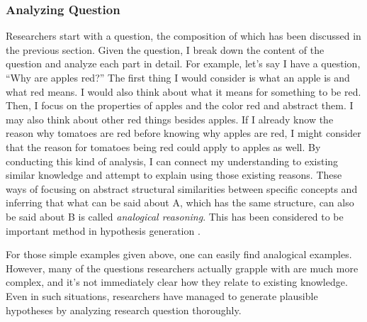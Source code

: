 
\subsubsection{Analyzing Question}
Researchers start with a question, the composition of which has been discussed in the previous section. Given the question, I break down the content of the question and analyze each part in detail. For example, let's say I have a question, ``Why are apples red?'' The first thing I would consider is what an apple is and what red means. I would also think about what it means for something to be red. Then, I focus on the properties of apples and the color red and abstract them. I may also think about other red things besides apples. If I already know the reason why tomatoes are red before knowing why apples are red, I might consider that the reason for tomatoes being red could apply to apples as well. By conducting this kind of analysis, I can connect my understanding to existing similar knowledge and attempt to explain using those existing reasons. These ways of focusing on abstract structural similarities between specific concepts and inferring that what can be said about A, which has the same structure, can also be said about B is called \textit{analogical reasoning}. This has been considered to be important method in hypothesis generation \cite{hesse1965models,thagard_1984,gentner1993shift,holyoak1996mental,dunbar1997scientists}.

For those simple examples given above, one can easily find analogical examples. However, many of the questions researchers actually grapple with are much more complex, and it's not immediately clear how they relate to existing knowledge. Even in such situations, researchers have managed to generate plausible hypotheses by analyzing research question thoroughly.

